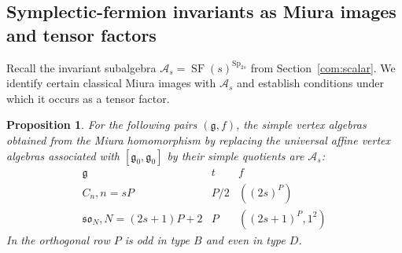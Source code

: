 \documentclass[11pt,a4paper]{amsart}
\numberwithin{equation}{section}
\newtheorem{proposition}[theorem]{Proposition}
\theoremstyle{definition}
\theoremstyle{remark}
\newcommand{\g}{\mathfrak g}
\newcommand{\sog}{\mathfrak{so}}
\newcommand{\SF}{\operatorname{SF}}
\newcommand{\Sp}{\operatorname{Sp}}
\begin{document}
\subsection{Symplectic-fermion invariants as Miura images and tensor factors}\label{seed:scalar}
Recall the invariant subalgebra
$\mathcal A_s=\SF(s)^{\Sp_{2s}}$ from Section~\ref{com:scalar}.
We identify certain classical Miura images with $\mathcal A_s$
and establish conditions under which it occurs as a tensor factor. 
\begin{proposition}\label{v6:scalar-partitions}
For the following pairs $(\g,f)$, the simple vertex algebras obtained
from the Miura homomorphism by replacing the universal affine
vertex algebras associated with $[\g_0,\g_0]$ by their simple
quotients are $\mathcal A_s$:
$$
\begin{array}{c|c|c}
 \g&t&f\\\hline
 C_n, n=sP&P/2&((2s)^P)\\
 \sog_N, N=(2s+1)P+2&P&((2s+1)^P,1^2)
\end{array}
$$
In the orthogonal row $P$ is odd in type $B$
and even in type $D$.
\end{proposition}
\end{document}
